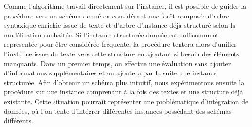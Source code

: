 Comme l'algorithme travail directement sur l'instance, il est possible de guider la procédure vers un schéma donné en considérant une forêt composée d'arbre syntaxique enrichie issue de texte et d'arbre d'instance déjà structuré selon la modélisation souhaitée.
Si l'instance structurée donnée est suffisamment représentée pour être considérée fréquente, la procédure tentera alors d'unifier l'instance issue du texte vers cette structure en ajoutant si besoin des éléments manquants.
Dans un premier temps, on effectue une évaluation sans ajouter d'informations supplémentaires et on ajoutera par la suite une instance structurée.
Afin d'obtenir un schéma plus intuitif, nous expérimentons ensuite la procédure sur une instance comprenant à la fois des textes et une structure déjà existante.
Cette situation pourrait représenter une problématique d'intégration de données, où l'on tente d'intégrer différentes instances possédant des schémas différents.
